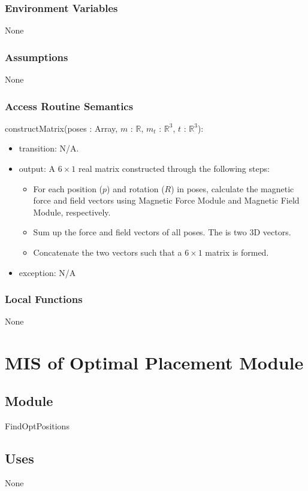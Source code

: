 \documentclass[12pt, titlepage]{article}
\begin{document}
\subsubsection{Environment Variables}
None

\subsubsection{Assumptions}
None 

\subsubsection{Access Routine Semantics}

\noindent constructMatrix(poses : Array, $m$ : $\mathbb{R}$, $m_t$ : $\mathbb{R}^3$, $t$ : $\mathbb{R}^3$):
\begin{itemize}
\item transition: N/A.
\item output: A $6 \times 1$ real matrix constructed through the following steps:
\begin{itemize}
  \item For each position ($p$) and rotation ($R$) in poses, calculate the magnetic force and field vectors using Magnetic Force Module and Magnetic Field Module, respectively. 
  \item Sum up the force and field vectors of all poses. The is two 3D vectors. 
  \item Concatenate the two vectors such that a $6 \times 1$ matrix is formed.
\end{itemize}
\item exception: N/A
\end{itemize}

\subsubsection{Local Functions}
None

\newpage


\section{MIS of Optimal Placement Module} \label{MISOptPlacement}

\subsection{Module}
FindOptPositions

\subsection{Uses}
None
\end{document}
